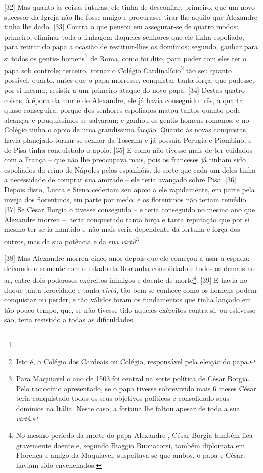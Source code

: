 {[}32{]} Mas quanto às coisas futuras, ele tinha de desconfiar,
primeiro, que um novo sucessor da Igreja não lhe fosse amigo e
procurasse tirar-lhe aquilo que Alexandre tinha lhe dado. {[}33{]}
Contra o que pensou em assegurar-se de quatro modos: primeiro, eliminar
toda a linhagem daqueles senhores que ele tinha espoliado, para retirar
do papa a ocasião de restituir-lhes os domínios; segundo, ganhar para si
todos os gentis- homens\footnote{} de Roma, como foi dito, para poder
com eles ter o papa sob controle; terceiro, tornar o Colégio
Cardinalício\footnote{Isto é, o Colégio dos Cardeais ou Colégio,
  responsável pela eleição do papa.} tão seu quanto possível; quarto,
antes que o papa morresse, conquistar tanta força, que pudesse, por si
mesmo, resistir a um primeiro ataque do novo papa. {[}34{]} Destas
quatro coisas, à época da morte de Alexandre, ele já havia conseguido
três, a quarta quase conseguira, porque dos senhores espoliados matou
tantos quanto pode alcançar e pouquíssimos se salvaram; e ganhou os
gentis-homens romanos; e no Colégio tinha o apoio de uma grandíssima
facção. Quanto às novas conquistas, havia planejado tornar-se senhor da
Toscana e já possuía Perugia e Piombino, e de Pisa tinha conquistado o
apoio. {[}35{]} E como não tivesse mais de ter cuidados com a França --
que não lhe preocupava mais, pois os franceses já tinham sido espoliados
do reino de Nápoles pelos espanhóis, de sorte que cada um deles tinha a
necessidade de comprar sua amizade -- ele teria avançado sobre Pisa.
{[}36{]} Depois disto, Lucca e Siena cederiam seu apoio a ele
rapidamente, em parte pela inveja dos florentinos, em parte por medo; e
os florentinos não teriam remédio. {[}37{]} Se César Borgia o tivesse
conseguido -- e teria conseguido no mesmo ano que Alexandre morreu --,
teria conquistado tanta força e tanta reputação que por si mesmo
ter-se-ia mantido e não mais seria dependente da fortuna e força dos
outros, mas da sua potência e da sua \emph{virtù}\footnote{Para
  Maquiavel o ano de 1503 foi central na sorte política de César Borgia.
  Pelo raciocínio apresentado, se o papa tivesse sobrevivido mais 6
  meses César teria conquistado todos os seus objetivos políticos e
  consolidado seus domínios na Itália. Neste caso, a fortuna lhe faltou
  apesar de toda a sua \emph{virtù.}}.

{[}38{]} Mas Alexandre morreu cinco anos depois que ele começou a usar a
espada: deixando-o somente com o estado da Romanha consolidado e todos
os demais no ar, entre dois poderosos exércitos inimigos e doente de
morte\footnote{No mesmo período da morte do papa Alexandre , César
  Borgia também fica gravemente doente e, segundo Biaggio Buonacorsi,
  também diplomata em Florença e amigo da Maquiavel, suspeitava-se que
  ambos, o papa e César, haviam sido envenenados.}. {[}39{]} E havia no
duque tanta ferocidade e tanta \emph{virtù}, tão bem se conhece como os
homens podem conquistar ou perder, e tão válidos foram os fundamentos
que tinha lançado em tão pouco tempo, que, se não tivesse tido aqueles
exércitos contra si, ou estivesse são, teria resistido a todas as
dificuldades.


